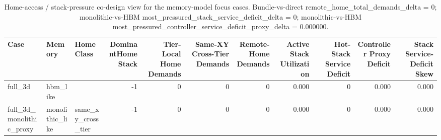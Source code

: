 \begin{table}[t]
  \centering
  \caption{Home-access / stack-pressure co-design view for the memory-model focus cases. Bundle-vs-direct remote\_home\_total\_demands\_delta = 0; monolithic-vs-HBM most\_pressured\_stack\_service\_deficit\_delta = 0; monolithic-vs-HBM most\_pressured\_controller\_service\_deficit\_proxy\_delta = 0.000000.}
  \begin{tabular}{l l l r r r r r r r r}
  \hline
  Case & Memory & HomeClass & DominantHomeStack & Tier-Local Home Demands & Same-XY Cross-Tier Demands & Remote-Home Demands & Active Stack Utilization & Hot-Stack Service Deficit & Controller Proxy Deficit & Stack Service-Deficit Skew \\
  \hline
  full\_3d & hbm\_like &  & -1 & 0 & 0 & 0 & 0.000 & 0 & 0.000 & 0.000 \\
  full\_3d\_monolithic\_proxy & monolithic\_like & same\_xy\_cross\_tier & -1 & 0 & 0 & 0 & 0.000 & 0 & 0.000 & 0.000 \\
  \hline
  \end{tabular}
\end{table}
